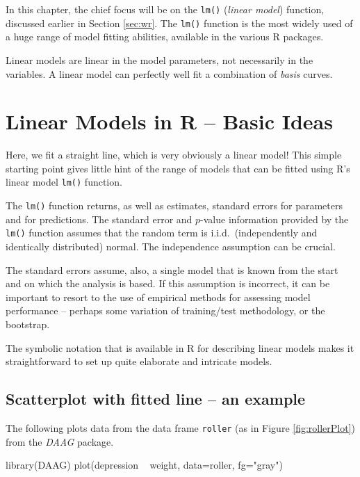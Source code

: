 \documentclass{tufte-book}\usepackage[]{graphicx}\usepackage[]{color}
\newcommand{\txtt}[1]{\texttt{#1}}
\begin{document}
In this chapter, the chief focus will be on the \txtt{lm()}
(\textit{linear model}) function, discussed earlier in Section
\ref{sec:wr}.  The \txtt{lm()} function is the most widely used of a
huge range of model fitting abilities, available in the various R
packages.

Linear models are linear in the model parameters, not necessarily in
the variables. A linear model can perfectly well fit a combination of
{\em basis} curves.

\section{Linear Models in R -- Basic Ideas}

Here, we fit a straight line, which is very obviously a linear model!
This simple starting point gives little hint of the range of models
that can be fitted using R's linear model \texttt{lm()} function.

The \texttt{lm()} function returns, as well as estimates, standard
errors for parameters and for predictions. The standard error and
$p$-value information provided by the \txtt{lm()} function assumes
that the random term is i.i.d.\ (independently and identically
distributed) normal.  The independence assumption can be crucial.

The standard errors assume, also, a single model that is known from
the start and on which the analysis is based.  If this assumption is incorrect, it can
be important to resort to the use of empirical methods for assessing
model performance -- perhaps some variation of training/test
methodology, or the bootstrap.

The symbolic notation  that is available in R for
describing linear models makes it straightforward to set up quite
elaborate and intricate models.

\subsection*{Scatterplot with fitted line -- an example}

The following plots data from the data frame \texttt{roller} (as in
Figure \ref{fig:rollerPlot}) from the \textit{DAAG} package.
\begin{Schunk}
\begin{Sinput}
library(DAAG)
plot(depression ~ weight, data=roller, fg="gray")
\end{Sinput}
\end{Schunk}
\end{document}
